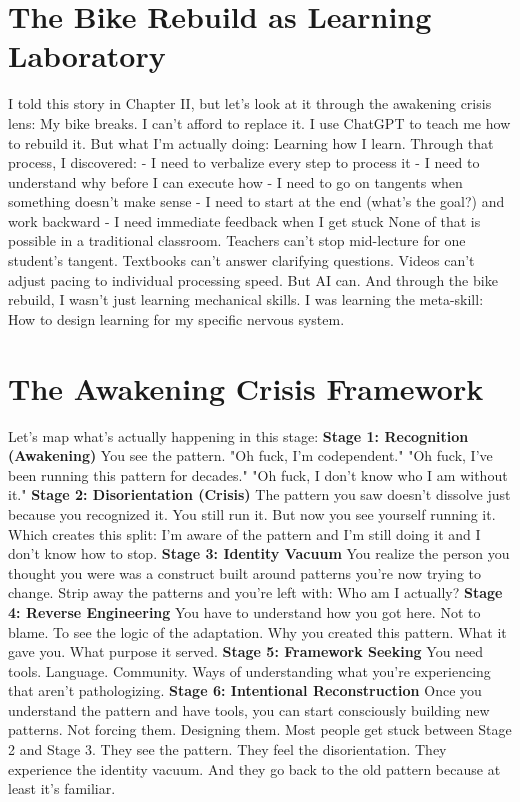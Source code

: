 \section{The Bike Rebuild as Learning Laboratory}

I told this story in Chapter II, but let's look at it through the awakening crisis lens:
My bike breaks. I can't afford to replace it. I use ChatGPT to teach me how to rebuild it.
But what I'm actually doing: Learning how I learn.
Through that process, I discovered:
- I need to verbalize every step to process it
- I need to understand why before I can execute how
- I need to go on tangents when something doesn't make sense
- I need to start at the end (what's the goal?) and work backward
- I need immediate feedback when I get stuck
None of that is possible in a traditional classroom.
Teachers can't stop mid-lecture for one student's tangent. Textbooks can't answer clarifying questions. Videos can't adjust pacing to individual processing speed.
But AI can.
And through the bike rebuild, I wasn't just learning mechanical skills. I was learning the meta-skill: How to design learning for my specific nervous system.

\section{The Awakening Crisis Framework}

Let's map what's actually happening in this stage:
\textbf{Stage 1: Recognition (Awakening)}
You see the pattern. "Oh fuck, I'm codependent." "Oh fuck, I've been running this pattern for decades." "Oh fuck, I don't know who I am without it."
\textbf{Stage 2: Disorientation (Crisis)}
The pattern you saw doesn't dissolve just because you recognized it. You still run it. But now you see yourself running it. Which creates this split: I'm aware of the pattern and I'm still doing it and I don't know how to stop.
\textbf{Stage 3: Identity Vacuum}
You realize the person you thought you were was a construct built around patterns you're now trying to change. Strip away the patterns and you're left with: Who am I actually?
\textbf{Stage 4: Reverse Engineering}
You have to understand how you got here. Not to blame. To see the logic of the adaptation. Why you created this pattern. What it gave you. What purpose it served.
\textbf{Stage 5: Framework Seeking}
You need tools. Language. Community. Ways of understanding what you're experiencing that aren't pathologizing.
\textbf{Stage 6: Intentional Reconstruction}
Once you understand the pattern and have tools, you can start consciously building new patterns. Not forcing them. Designing them.
Most people get stuck between Stage 2 and Stage 3.
They see the pattern. They feel the disorientation. They experience the identity vacuum. And they go back to the old pattern because at least it's familiar.

